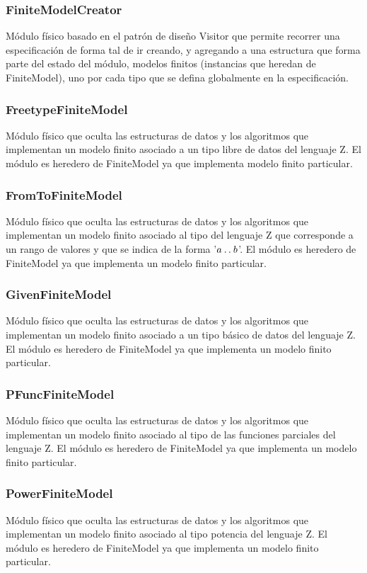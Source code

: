 \documentclass[a4paper,10pt]{report}
\begin{document}
			\subsubsection{FiniteModelCreator}
			Módulo físico basado en el patrón de diseño Visitor que permite recorrer una especificación de forma tal de ir creando, y agregando a una estructura que forma parte del estado del módulo, modelos finitos (instancias que heredan de FiniteModel), uno por cada tipo que se defina globalmente en la especificación.
			\subsubsection{FreetypeFiniteModel}
			Módulo físico que oculta las estructuras de datos y los algoritmos que implementan un modelo finito asociado a un tipo libre de datos del lenguaje Z. El módulo es heredero de FiniteModel ya que implementa modelo finito particular.
			\subsubsection{FromToFiniteModel}
			Módulo físico que oculta las estructuras de datos y los algoritmos que implementan un modelo finito asociado al tipo del lenguaje Z que corresponde a un rango de valores y que se indica de la forma '$a \mathbin{\ldotp\ldotp} b$'. El módulo es heredero de FiniteModel ya que implementa un modelo finito particular.
			\subsubsection{GivenFiniteModel}
			Módulo físico que oculta las estructuras de datos y los algoritmos que implementan un modelo finito asociado a un tipo básico de datos del lenguaje Z. El módulo es heredero de FiniteModel ya que implementa un modelo finito particular.
			\subsubsection{PFuncFiniteModel}
			Módulo físico que oculta las estructuras de datos y los algoritmos que implementan un modelo finito asociado al tipo de las funciones parciales del lenguaje Z. El módulo es heredero de FiniteModel ya que implementa un modelo finito particular.
			\subsubsection{PowerFiniteModel}
			Módulo físico que oculta las estructuras de datos y los algoritmos que implementan un modelo finito asociado al tipo potencia del lenguaje Z. El módulo es heredero de FiniteModel ya que implementa un modelo finito particular.
\end{document}

